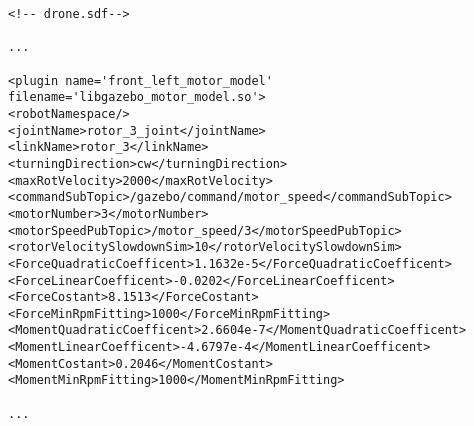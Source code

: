 \lstset{language=XML}
\begin{lstlisting}
<!-- drone.sdf-->

...

<plugin name='front_left_motor_model' filename='libgazebo_motor_model.so'>
<robotNamespace/>
<jointName>rotor_3_joint</jointName>
<linkName>rotor_3</linkName>
<turningDirection>cw</turningDirection>
<maxRotVelocity>2000</maxRotVelocity>
<commandSubTopic>/gazebo/command/motor_speed</commandSubTopic>
<motorNumber>3</motorNumber>
<motorSpeedPubTopic>/motor_speed/3</motorSpeedPubTopic>
<rotorVelocitySlowdownSim>10</rotorVelocitySlowdownSim>
<ForceQuadraticCoefficent>1.1632e-5</ForceQuadraticCoefficent>
<ForceLinearCoefficent>-0.0202</ForceLinearCoefficent>
<ForceCostant>8.1513</ForceCostant>
<ForceMinRpmFitting>1000</ForceMinRpmFitting>
<MomentQuadraticCoefficent>2.6604e-7</MomentQuadraticCoefficent>
<MomentLinearCoefficent>-4.6797e-4</MomentLinearCoefficent>
<MomentCostant>0.2046</MomentCostant>
<MomentMinRpmFitting>1000</MomentMinRpmFitting>

...

\end{lstlisting}